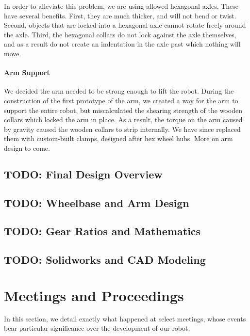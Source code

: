 \documentclass{article}
\begin{document}
In order to alleviate this problem, we are using allowed hexagonal axles. These have several benefits. First, they are much thicker, and will not bend or twist. Second, objects that are locked into a hexagonal axle cannot rotate freely around the axle. Third, the hexagonal collars do not lock against the axle themselves, and as a result do not create an indentation in the axle past which nothing will move. 

\paragraph{Arm Support} We decided the arm needed to be strong enough to lift the robot. During the construction of the first prototype of the arm, we created a way for the arm to support the entire robot, but miscalculated the shearing strength of the wooden collars which locked the arm in place. As a result, the torque on the arm caused by gravity caused the wooden collars to strip internally. We have since replaced them with custom-built clamps, designed after hex wheel hubs. More on arm design to come.

\newpage \subsection{TODO: Final Design Overview}
\newpage \subsection{TODO: Wheelbase and Arm Design}
\newpage \subsection{TODO: Gear Ratios and Mathematics}
\newpage \subsection{TODO: Solidworks and CAD Modeling}

\newpage \section{Meetings and Proceedings}
In this section, we detail exactly what happened at select meetings, whose events bear particular significance over the development of our robot.
\end{document}
